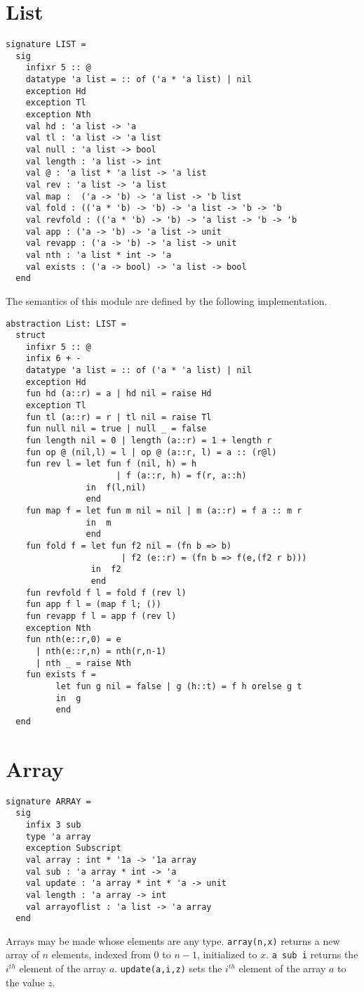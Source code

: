 \section{List}
\begin{verbatim}
signature LIST =
  sig
    infixr 5 :: @
    datatype 'a list = :: of ('a * 'a list) | nil
    exception Hd
    exception Tl
    exception Nth
    val hd : 'a list -> 'a
    val tl : 'a list -> 'a list 
    val null : 'a list -> bool 
    val length : 'a list -> int 
    val @ : 'a list * 'a list -> 'a list
    val rev : 'a list -> 'a list 
    val map :  ('a -> 'b) -> 'a list -> 'b list
    val fold : (('a * 'b) -> 'b) -> 'a list -> 'b -> 'b
    val revfold : (('a * 'b) -> 'b) -> 'a list -> 'b -> 'b
    val app : ('a -> 'b) -> 'a list -> unit
    val revapp : ('a -> 'b) -> 'a list -> unit
    val nth : 'a list * int -> 'a 
    val exists : ('a -> bool) -> 'a list -> bool
  end
\end{verbatim}
The semantics of this module are defined by the
following implementation.
\begin{verbatim}
abstraction List: LIST =
  struct
    infixr 5 :: @ 
    infix 6 + -
    datatype 'a list = :: of ('a * 'a list) | nil
    exception Hd
    fun hd (a::r) = a | hd nil = raise Hd
    exception Tl
    fun tl (a::r) = r | tl nil = raise Tl    
    fun null nil = true | null _ = false
    fun length nil = 0 | length (a::r) = 1 + length r
    fun op @ (nil,l) = l | op @ (a::r, l) = a :: (r@l)
    fun rev l = let fun f (nil, h) = h 
                      | f (a::r, h) = f(r, a::h)
                in  f(l,nil)
                end
    fun map f = let fun m nil = nil | m (a::r) = f a :: m r
                in  m
                end
    fun fold f = let fun f2 nil = (fn b => b)
                       | f2 (e::r) = (fn b => f(e,(f2 r b)))
                 in  f2
                 end
    fun revfold f l = fold f (rev l)
    fun app f l = (map f l; ())
    fun revapp f l = app f (rev l)
    exception Nth
    fun nth(e::r,0) = e 
      | nth(e::r,n) = nth(r,n-1)
      | nth _ = raise Nth
    fun exists f =
          let fun g nil = false | g (h::t) = f h orelse g t
          in  g
          end
  end
\end{verbatim}
\section{Array}
\begin{verbatim}
signature ARRAY =
  sig
    infix 3 sub
    type 'a array
    exception Subscript
    val array : int * '1a -> '1a array
    val sub : 'a array * int -> 'a
    val update : 'a array * int * 'a -> unit
    val length : 'a array -> int
    val arrayoflist : 'a list -> 'a array
  end
\end{verbatim}
Arrays may be made whose elements are any type.  \verb"array(n,x)"
returns a new array of $n$ elements, indexed from $0$ to $n-1$,
initialized to $x$.  \verb"a sub i" returns the $i^{th}$ element of
the array $a$.  \verb"update(a,i,z)" sets the $i^{th}$ element of the
array $a$ to the value $z$.


